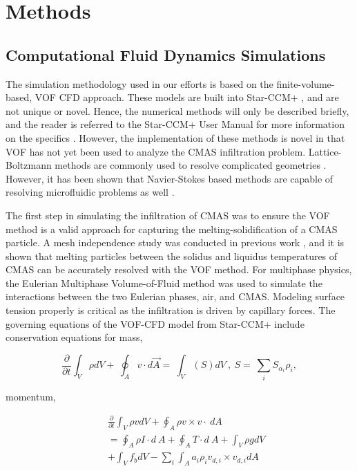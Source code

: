 \documentclass[%
 aip,
 amsmath,amssymb,
 reprint,%
]{revtex4-1}
\begin{document}
\section{Methods}
\label{sec:methods}

\subsection{Computational Fluid Dynamics Simulations}
The simulation methodology used in our efforts\cite{Cavainolo2023, Cavainolo2022} is based on the finite-volume-based, VOF CFD approach. These models are built into Star-CCM+ \cite{starccm}, and are not unique or novel. Hence, the numerical methods will only be described briefly, and the reader is referred to the Star-CCM+ User Manual for more information on the specifics \cite{starccm}. However, the implementation of these methods is novel in that VOF has not yet been used to analyze the CMAS infiltration problem. Lattice-Boltzmann methods are commonly used to resolve complicated geometries \cite{Zhang2011}. However, it has been shown that Navier-Stokes based methods are capable of resolving microfluidic problems as well \cite{LeHenaff2022}.

The first step in simulating the infiltration of CMAS was to ensure the VOF method is a valid approach for capturing the melting-solidification of a CMAS particle. A mesh independence study was conducted in previous work \cite{Cavainolo2022}, and it is shown that melting particles between the solidus and liquidus temperatures of CMAS can be accurately resolved with the VOF method. For multiphase physics, the Eulerian Multiphase Volume-of-Fluid method was used to simulate the interactions between the two Eulerian phases, air, and CMAS.  Modeling surface tension properly is critical as the infiltration is driven by capillary forces. The governing equations of the VOF-CFD model from  Star-CCM+ \cite{starccm} include conservation equations for mass,

\begin{equation}
\label{consMass:equation}
    \frac{\partial}{\partial t}\int_{V}\rho dV+\ \oint_{A}{v\cdot d\Vec{A}}=\ \int_{V}\left(S\right)dV\ ,\ S=\ \sum_{i}{S_{\alpha_i}\rho_i},
\end{equation}

\noindent momentum,

\begin{eqnarray}
\label{consMomentum:equation}
    &&\frac{\partial}{\partial t}\int_{V}\rho vdV+\oint_{A}{\rho v\times v}\cdot\ dA \nonumber\\
    &&=\oint_{A}{\rho I\cdot d\ A}+\oint_{A}{T\cdot d\ A}+\int_{V}\rho gdV\ \\
    &&+\int_{V}{f_bdV}-\sum_{i}\int_{A}{a_i\rho_iv_{d,i}\times v_{d,i}dA}\nonumber
\end{eqnarray}
\end{document}
